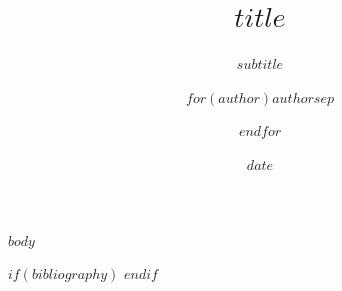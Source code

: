 \documentclass{qlnotes-export}
\title{$title$}
\subtitle{$subtitle$}
\author{$for(author)$$author$$sep$ \and $endfor$}
\date{$date$}
\begin{document}
\frontmatter
\maketitle
\tableofcontents

\mainmatter
$body$

$if(bibliography)$
\printbibliography
$endif$
\end{document}
